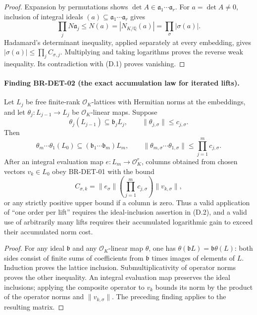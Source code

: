 \documentclass[11pt,a4paper]{article}
\theoremstyle{definition}\newtheorem{definition}[theorem]{Definition}
\theoremstyle{remark}\newtheorem{remark}[theorem]{Remark}
\begin{document}
\begin{proof}
Expansion by permutations shows
$\det A\in\mathfrak a_1\cdots\mathfrak a_r$.
For $a=\det A\ne0$, inclusion of integral ideals
$(a)\subseteq\mathfrak a_1\cdots\mathfrak a_r$ gives
\[
 \prod_jN\mathfrak a_j
 \leq N(a)=|N_{K/\mathbb Q}(a)|
 =\prod_\sigma|\sigma(a)|.
\]
Hadamard's determinant inequality, applied separately at every
embedding, gives
$|\sigma(a)|\leq\prod_j C_{\sigma,j}$.
Multiplying and taking logarithms proves the reverse weak
inequality.  Its contradiction with (D.1) proves vanishing.
\end{proof}

\paragraph{Finding BR-DET-02 (the exact accumulation law for iterated lifts).}
Let $L_j$ be free finite-rank $\mathcal O_K$-lattices with Hermitian
norms at the embeddings, and let
$\theta_j:L_{j-1}\to L_j$ be $\mathcal O_K$-linear maps.
Suppose
\[
 \theta_j(L_{j-1})\subseteq\mathfrak b_jL_j,
 \qquad \|\theta_{j,\sigma}\|\leq c_{j,\sigma}.
\]
Then
\[
 \theta_m\cdots\theta_1(L_0)
   \subseteq(\mathfrak b_1\cdots\mathfrak b_m)L_m,
 \qquad
 \|\theta_{m,\sigma}\cdots\theta_{1,\sigma}\|
   \leq\prod_{j=1}^m c_{j,\sigma}.                            \tag{D.2}
\]
After an integral evaluation map $e:L_m\to\mathcal O_K^r$, columns
obtained from chosen vectors $v_k\in L_0$ obey BR-DET-01 with
the bound
\[
 C_{\sigma,k}=\|e_\sigma\|
       \left(\prod_{j=1}^m c_{j,\sigma}\right)\|v_{k,\sigma}\|,
\]
or any strictly positive upper bound if a column is zero.
Thus a valid application of ``one order
per lift'' requires the ideal-inclusion assertion in (D.2), and
a valid use of arbitrarily many lifts requires their accumulated
logarithmic gain to exceed their accumulated norm cost.

\begin{proof}
For any ideal $\mathfrak b$ and any $\mathcal O_K$-linear map
$\theta$, one has $\theta(\mathfrak bL)=\mathfrak b\theta(L)$:
both sides consist of finite sums of coefficients from
$\mathfrak b$ times images of elements of $L$.
Induction proves the lattice inclusion.  Submultiplicativity of
operator norms proves the other inequality.  An integral
evaluation map preserves the ideal inclusions; applying the
composite operator to $v_k$ bounds its norm by the product of
the operator norms and $\|v_{k,\sigma}\|$. The preceding
finding applies to the resulting matrix.
\end{proof}
\end{document}
